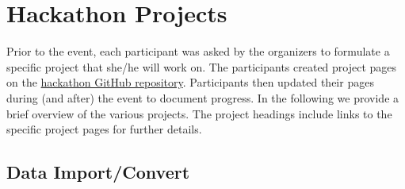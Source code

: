 \documentclass{article}
\begin{document}
\clearpage
\section{Hackathon Projects}
\label{sec:userprojects}

Prior to the event, each participant was asked by the organizers to formulate a specific project that 
she/he will work on. The participants created project pages on the \href{https://neurodatawithoutborders.github.io/nwb_hackathons/HCK06_2019_Janelia/#projects}{hackathon GitHub repository}. Participants then updated their pages during (and after) the event to document progress. In the following we provide a brief overview of the various projects. The project headings include links to the specific project pages
for further details. 

\subsection{Data Import/Convert}
\end{document}

